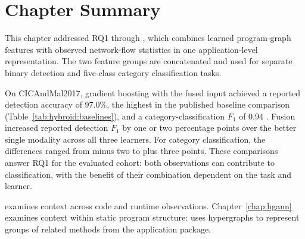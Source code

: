 \section{Chapter Summary}
\label{sec:hybroid:13}

This chapter addressed RQ1 through \hybroid{}, which combines learned program-graph features
with observed network-flow statistics in one application-level representation. The two feature
groups are concatenated and used for separate binary detection and five-class category
classification tasks.

On CICAndMal2017, gradient boosting with the fused input achieved a reported detection accuracy
of 97.0\%, the highest in the published baseline comparison
(Table~\ref{tab:hybroid:baselines}), and a category-classification $F_1$ of 0.94
\cite{norouzian2021hybroid}. Fusion increased reported detection $F_1$ by one or two percentage
points over the better single modality across all three learners. For category classification,
the differences ranged from minus two to plus three points. These comparisons answer RQ1 for
the evaluated cohort: both observations can contribute to classification, with the benefit of
their combination dependent on the task and learner.

\hybroid{} examines context across code and runtime observations. Chapter~\ref{chap:hgann}
examines context within static program structure: \hgann{} uses hypergraphs to represent
groups of related methods from the application package.
